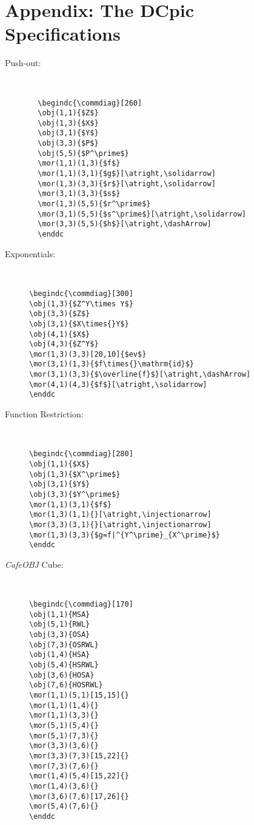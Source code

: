 \documentclass{europroc}
\begin{document}
\section{Appendix: The DCpic Specifications}

\begin{description}

\item[Push-out:] {\ }

{\footnotesize
\begin{verbatim}
  \begindc{\commdiag}[260]
  \obj(1,1){$Z$} 
  \obj(1,3){$X$}
  \obj(3,1){$Y$}
  \obj(3,3){$P$}
  \obj(5,5){$P^\prime$}
  \mor(1,1)(1,3){$f$}
  \mor(1,1)(3,1){$g$}[\atright,\solidarrow]
  \mor(1,3)(3,3){$r$}[\atright,\solidarrow]
  \mor(3,1)(3,3){$s$}
  \mor(1,3)(5,5){$r^\prime$}
  \mor(3,1)(5,5){$s^\prime$}[\atright,\solidarrow]
  \mor(3,3)(5,5){$h$}[\atright,\dashArrow]
  \enddc
\end{verbatim}
}


\item[Exponentials:] {\ }

{\footnotesize
\begin{verbatim}
\begindc{\commdiag}[300]
\obj(1,3){$Z^Y\times Y$}
\obj(3,3){$Z$}
\obj(3,1){$X\times{}Y$}
\obj(4,1){$X$}
\obj(4,3){$Z^Y$}
\mor(1,3)(3,3)[20,10]{$ev$}
\mor(3,1)(1,3){$f\times{}\mathrm{id}$}
\mor(3,1)(3,3){$\overline{f}$}[\atright,\dashArrow]
\mor(4,1)(4,3){$f$}[\atright,\solidarrow]
\enddc
\end{verbatim}
}

\item[Function Restriction:] {\ }

{\footnotesize
\begin{verbatim}
\begindc{\commdiag}[280]
\obj(1,1){$X$}
\obj(1,3){$X^\prime$}
\obj(3,1){$Y$}
\obj(3,3){$Y^\prime$}
\mor(1,1)(3,1){$f$}
\mor(1,3)(1,1){}[\atright,\injectionarrow]
\mor(3,3)(3,1){}[\atright,\injectionarrow]
\mor(1,3)(3,3){$g=f|^{Y^\prime}_{X^\prime}$}
\enddc
\end{verbatim}
}

\item[{\em CafeOBJ\/} Cube:] {\ }

{\footnotesize
\begin{verbatim}
\begindc{\commdiag}[170]
\obj(1,1){MSA}
\obj(5,1){RWL}
\obj(3,3){OSA}
\obj(7,3){OSRWL}
\obj(1,4){HSA}
\obj(5,4){HSRWL}
\obj(3,6){HOSA}
\obj(7,6){HOSRWL}
\mor(1,1)(5,1)[15,15]{}
\mor(1,1)(1,4){} 
\mor(1,1)(3,3){} 
\mor(5,1)(5,4){} 
\mor(5,1)(7,3){} 
\mor(3,3)(3,6){} 
\mor(3,3)(7,3)[15,22]{}
\mor(7,3)(7,6){} 
\mor(1,4)(5,4)[15,22]{}
\mor(1,4)(3,6){} 
\mor(3,6)(7,6)[17,26]{}
\mor(5,4)(7,6){}
\enddc
\end{verbatim}
}



\end{description}
\end{document}
